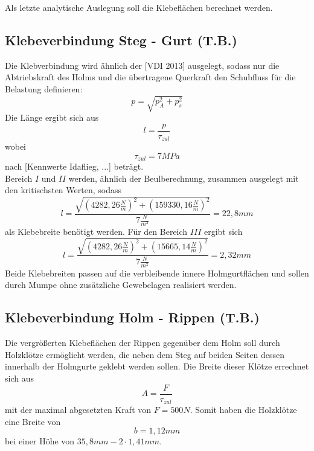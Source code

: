 Als letzte analytische Auslegung soll die Klebeflächen berechnet werden.
\subsection{Klebeverbindung Steg - Gurt (T.B.)}
Die Klebverbindung wird ähnlich der [VDI 2013]  ausgelegt, sodass nur die Abtriebskraft des Holms und die übertragene Querkraft den Schubfluss für die Belastung definieren:
\begin{equation}
	p=\sqrt{p_{A}^{2}+p_{s}^{2}}
\end{equation}
Die Länge ergibt sich aus 
\begin{equation}
	l=\frac{p}{\tau_{zul}}
\end{equation}
wobei 
\begin{equation}
	\tau_{zul}=7MPa
\end{equation}
nach [Kennwerte Idaflieg, ...] beträgt.\\

\noindent Bereich $I$ und $II$ werden, ähnlich der Beulberechnung, zusammen ausgelegt mit den kritischsten Werten, sodass 
\begin{equation}
	l=\frac{\sqrt{(4282,26\frac{N}{m})^{2}+(159330,16\frac{N}{m})^{2}}}{7\frac{N}{m^{2}}}=22,8mm
\end{equation}
als Klebebreite benötigt werden. Für den Bereich $III$ ergibt sich
\begin{equation}
	l=\frac{\sqrt{(4282,26\frac{N}{m})^{2}+(15665,14\frac{N}{m})^{2}}}{7\frac{N}{m^{2}}}=2,32mm
\end{equation}
Beide Klebebreiten passen auf die verbleibende innere Holmgurtflächen und sollen durch Mumpe ohne zusätzliche Gewebelagen realisiert werden.

\subsection{Klebeverbindung Holm - Rippen (T.B.)}
Die vergrößerten Klebeflächen der Rippen gegenüber dem Holm soll durch Holzklötze ermöglicht werden, die neben dem Steg auf beiden Seiten dessen innerhalb der Holmgurte geklebt werden sollen. Die Breite dieser Klötze errechnet sich aus 
\begin{equation}
	A=\frac{F}{\tau_{zul}}
\end{equation}
mit der maximal abgesetzten Kraft von $F=500N$.
Somit haben die Holzklötze eine Breite von 
\begin{equation}
	b=1,12mm
\end{equation}
bei einer Höhe von $35,8mm-2\cdot 1,41mm$.